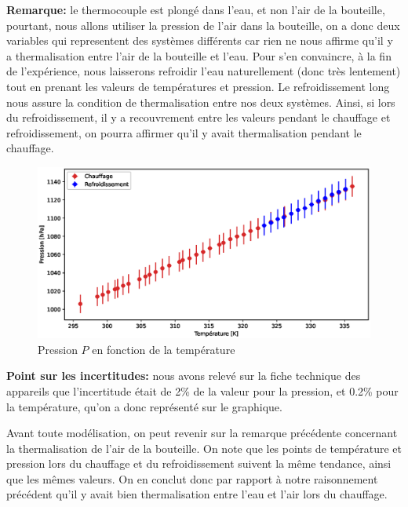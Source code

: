 \documentclass[12pt]{article}
\begin{document}
\newpage
\textbf{Remarque:} le thermocouple est plongé dans l'eau, et non l'air de la bouteille, pourtant, nous allons utiliser la pression de l'air dans
la bouteille, on a donc deux variables qui representent des systèmes différents car rien ne nous affirme qu'il y a thermalisation entre l'air de la bouteille et l'eau.
Pour s'en convaincre, à la fin de l'expérience, nous laisserons refroidir l'eau naturellement (donc très lentement) tout en prenant les valeurs de températures et pression. 
Le refroidissement long nous assure la condition de thermalisation entre nos deux systèmes. Ainsi, si lors du refroidissement, il y a recouvrement entre les valeurs pendant le chauffage et 
refroidissement, on pourra affirmer qu'il y avait thermalisation pendant le chauffage.

\begin{figure}[!h]
	\begin{center}
		\includegraphics[scale=0.68]{img/exp2_graph1.eps}
		\caption{Pression $P$ en fonction de la température}
	\end{center}
	\label{Exp2_graph1}
\end{figure}

\textbf{Point sur les incertitudes:} nous avons relevé sur la fiche technique des appareils que l'incertitude était de 2\% de la valeur pour la pression, et 0.2\% pour la température, qu'on a donc représenté sur
le graphique.

Avant toute modélisation, on peut revenir sur la remarque précédente concernant la thermalisation de l'air de la bouteille. On note que les points de température et pression lors du chauffage et 
du refroidissement suivent la même tendance, ainsi que les mêmes valeurs. On en conclut donc par rapport à notre raisonnement précédent qu'il y avait bien thermalisation entre l'eau et l'air lors du chauffage.
\end{document}
